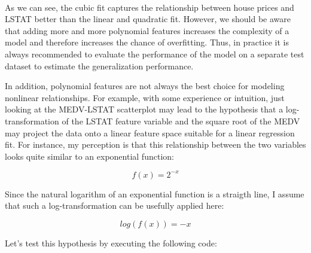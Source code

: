 \documentclass[11pt]{article}
\begin{document}
    \begin{center}
    \end{center}
    { \hspace*{\fill} \\}
    
    As we can see, the cubic fit captures the relationship between house
prices and LSTAT better than the linear and quadratic fit. However, we
should be aware that adding more and more polynomial features increases
the complexity of a model and therefore increases the chance of
overfitting. Thus, in practice it is always recommended to evaluate the
performance of the model on a separate test dataset to estimate the
generalization performance.

In addition, polynomial features are not always the best choice for
modeling nonlinear relationships. For example, with some experience or
intuition, just looking at the MEDV-LSTAT scatterplot may lead to the
hypothesis that a log-transformation of the LSTAT feature variable and
the square root of the MEDV may project the data onto a linear feature
space suitable for a linear regression fit. For instance, my perception
is that this relationship between the two variables looks quite similar
to an exponential function:

\[f(x) = 2^{-x}\]

Since the natural logarithm of an exponential function is a straigth
line, I assume that such a log-transformation can be usefully applied
here:

\[log(f(x)) = -x\]

Let's test this hypothesis by executing the following code:
\end{document}
